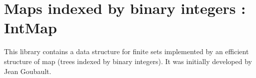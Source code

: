 \section{Maps indexed by binary integers : IntMap}\label{IntMap}

This library contains a data structure for finite sets implemented by
an efficient structure of map (trees indexed by binary integers).
It was initially developed by Jean Goubault.

